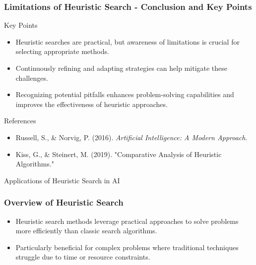 \documentclass[aspectratio=169]{beamer}
\begin{document}
\begin{frame}[fragile]
    \frametitle{Limitations of Heuristic Search - Conclusion and Key Points}
    \begin{block}{Key Points}
        \begin{itemize}
            \item Heuristic searches are practical, but awareness of limitations is crucial for selecting appropriate methods.
            \item Continuously refining and adapting strategies can help mitigate these challenges.
            \item Recognizing potential pitfalls enhances problem-solving capabilities and improves the effectiveness of heuristic approaches.
        \end{itemize}
    \end{block}
    
    \begin{block}{References}
        \begin{itemize}
            \item Russell, S., \& Norvig, P. (2016). \textit{Artificial Intelligence: A Modern Approach}.
            \item Kiss, G., \& Steinert, M. (2019). "Comparative Analysis of Heuristic Algorithms."
        \end{itemize}
    \end{block}
\end{frame}

\begin{frame}[fragile]{Applications of Heuristic Search in AI}
    \frametitle{Overview of Heuristic Search}
    \begin{itemize}
        \item Heuristic search methods leverage practical approaches to solve problems more efficiently than classic search algorithms.
        \item Particularly beneficial for complex problems where traditional techniques struggle due to time or resource constraints.
    \end{itemize}
\end{frame}
\end{document}
